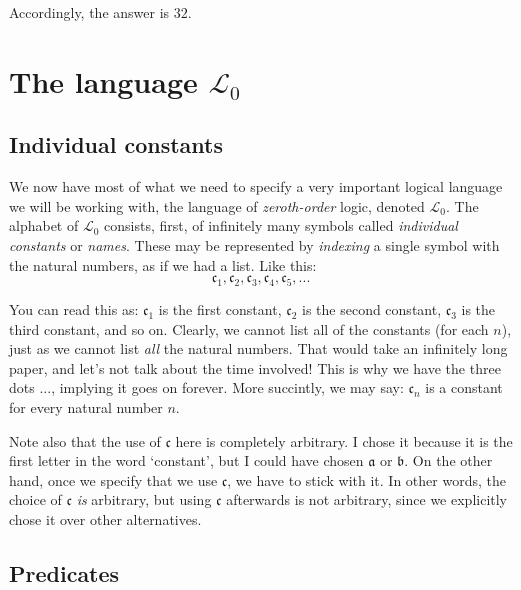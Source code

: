 \begin{center}
	\begin{forest}
		[$8 \times 4$
		]
	\end{forest}
\end{center}

Accordingly, the answer is $32$. 

\section{The language $\mathcal{L}_0$}

\subsection{Individual constants}

We now have most of what we need to specify a very important logical language we will be working with, the language of \textit{zeroth-order} logic, denoted $\mathcal{L}_0$. The alphabet of $\mathcal{L}_0$ consists, first, of infinitely many symbols called \textit{individual constants} or \textit{names}. These may be represented by \textit{indexing} a single symbol with the natural numbers, as if we had a list. Like this:
\[
\mathfrak{c}_1, \mathfrak{c}_2, \mathfrak{c}_3, \mathfrak{c}_4, \mathfrak{c}_5, ...
\]

You can read this as: $\mathfrak{c}_1$ is the first constant, $\mathfrak{c}_2$ is the second constant, $\mathfrak{c}_3$ is the third constant, and so on. Clearly, we cannot list all of the constants (for each $n$), just as we cannot list \textit{all} the natural numbers. That would take an infinitely long paper, and let's not talk about the time involved! This is why we have the three dots $...$, implying it goes on forever. More succintly, we may say: $\mathfrak{c}_n$ is a constant for every natural number $n$. 

Note also that the use of $\mathfrak{c}$ here is completely arbitrary. I chose it because it is the first letter in the word `constant', but I could have chosen $\mathfrak{a}$ or $\mathfrak{b}$. On the other hand, once we specify that we use $\mathfrak{c}$, we have to stick with it. In other words, the choice of $\mathfrak{c}$ \textit{is} arbitrary, but using $\mathfrak{c}$ afterwards is not arbitrary, since we explicitly chose it over other alternatives. 

\subsection{Predicates}

